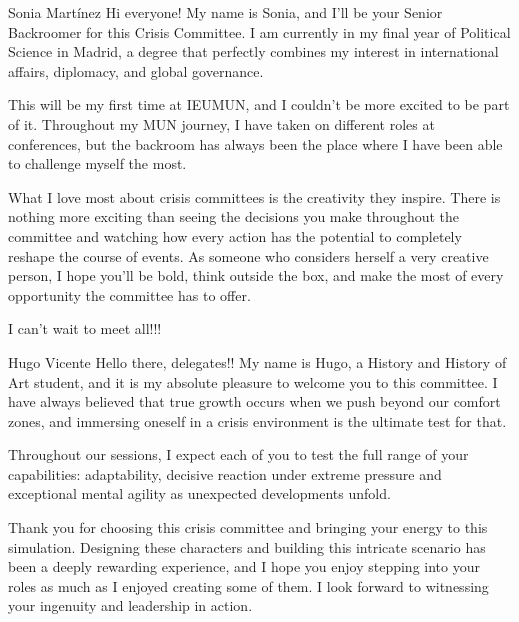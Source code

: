 \begin{chairletter}{Sonia Martínez}
Hi everyone! My name is Sonia, and I’ll be your Senior Backroomer for this Crisis Committee. I am currently in my final year of Political Science in Madrid, a degree that perfectly combines my interest in international affairs, diplomacy, and global governance.

This will be my first time at IEUMUN, and I couldn’t be more excited to be part of it. Throughout my MUN journey, I have taken on different roles at conferences, but the backroom has always been the place where I have been able to challenge myself the most.

What I love most about crisis committees is the creativity they inspire. There is nothing more exciting than seeing the decisions you make throughout the committee and watching how every action has the potential to completely reshape the course of events. As someone who considers herself a very creative person, I hope you’ll be bold, think outside the box, and make the most of every opportunity the committee has to offer.

I can’t wait to meet all!!!

\end{chairletter}

\begin{chairletter}{Hugo Vicente}
Hello there, delegates!! My name is Hugo, a History and History of Art student, and it is my absolute pleasure to welcome you to this committee. I have always believed that true growth occurs when we push beyond our comfort zones, and immersing oneself in a crisis environment is the ultimate test for that.

Throughout our sessions, I expect each of you to test the full range of your capabilities: adaptability, decisive reaction under extreme pressure and exceptional mental agility as unexpected developments unfold.

Thank you for choosing this crisis committee and bringing your energy to this simulation. Designing these characters and building this intricate scenario has been a deeply rewarding experience, and I hope you enjoy stepping into your roles as much as I enjoyed creating some of them. I look forward to witnessing your ingenuity and leadership in action.

\end{chairletter}

